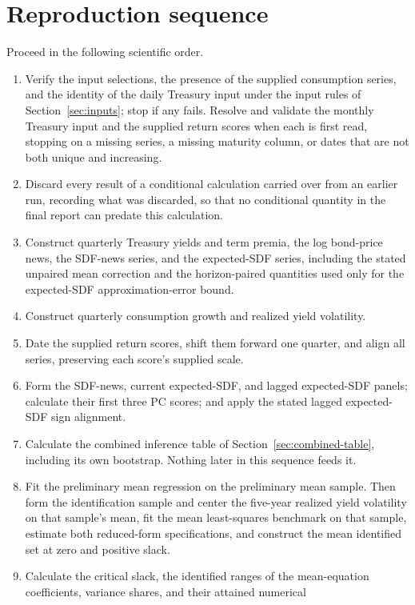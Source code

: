 \documentclass[11pt]{article}
\begin{document}
\section{Reproduction sequence}
\label{sec:sequence}

Proceed in the following scientific order.

\begin{enumerate}
\item Verify the input selections, the presence of the supplied consumption series, and the identity
of the daily Treasury input under the input rules of Section~\ref{sec:inputs}; stop if any fails.
Resolve and validate the monthly Treasury input and the supplied return scores when
each is first read, stopping on a missing series, a missing maturity column, or dates that are not
both unique and increasing.
\item Discard every result of a conditional calculation carried over from an earlier run, recording
what was discarded, so that no conditional quantity in the final report can predate this calculation.
\item Construct quarterly Treasury yields and term premia, the log bond-price news, the SDF-news
series, and the expected-SDF series, including the stated unpaired mean correction and the horizon-paired quantities
used only for the expected-SDF approximation-error bound.
\item Construct quarterly consumption growth and realized yield volatility.
\item Date the supplied return scores, shift them forward one quarter, and align all
series, preserving each score's supplied scale.
\item Form the SDF-news, current expected-SDF, and lagged expected-SDF panels; calculate their first
three PC scores; and apply the stated lagged expected-SDF sign alignment.
\item Calculate the combined inference table of Section~\ref{sec:combined-table}, including its
own bootstrap. Nothing later in this sequence feeds it.
\item Fit the preliminary mean regression on the preliminary mean sample. Then form the
identification sample and center the five-year realized yield volatility on that sample's mean, fit the
mean least-squares benchmark on that sample, estimate
both reduced-form specifications, and construct the mean identified set at zero and positive slack.
\item Calculate the critical slack, the identified ranges of the mean-equation coefficients, variance shares, and their attained numerical

\end{enumerate}
\end{document}
